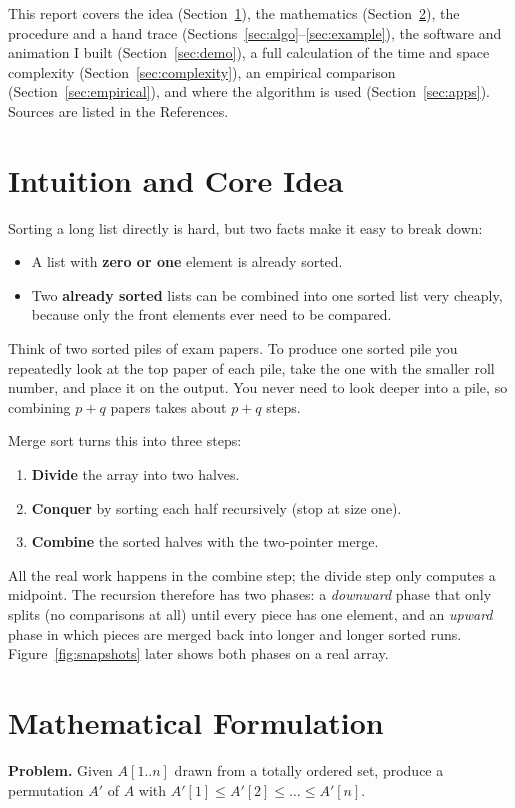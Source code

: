 \documentclass[11pt,a4paper]{article}
\theoremstyle{plain}
\theoremstyle{definition}
\begin{document}
This report covers the idea (Section~\ref{sec:intuition}), the mathematics (Section~\ref{sec:math}), the procedure and a hand trace (Sections~\ref{sec:algo}--\ref{sec:example}), the software and animation I built (Section~\ref{sec:demo}), a full calculation of the time and space complexity (Section~\ref{sec:complexity}), an empirical comparison (Section~\ref{sec:empirical}), and where the algorithm is used (Section~\ref{sec:apps}). Sources are listed in the References.

\section{Intuition and Core Idea}\label{sec:intuition}
Sorting a long list directly is hard, but two facts make it easy to break down:
\begin{itemize}
  \item A list with \textbf{zero or one} element is already sorted.
  \item Two \textbf{already sorted} lists can be combined into one sorted list very cheaply, because only the front elements ever need to be compared.
\end{itemize}
Think of two sorted piles of exam papers. To produce one sorted pile you repeatedly look at the top paper of each pile, take the one with the smaller roll number, and place it on the output. You never need to look deeper into a pile, so combining $p+q$ papers takes about $p+q$ steps.

Merge sort turns this into three steps:
\begin{enumerate}
  \item \textbf{Divide} the array into two halves.
  \item \textbf{Conquer} by sorting each half recursively (stop at size one).
  \item \textbf{Combine} the sorted halves with the two-pointer merge.
\end{enumerate}
All the real work happens in the combine step; the divide step only computes a midpoint. The recursion therefore has two phases: a \emph{downward} phase that only splits (no comparisons at all) until every piece has one element, and an \emph{upward} phase in which pieces are merged back into longer and longer sorted runs. Figure~\ref{fig:snapshots} later shows both phases on a real array.

\section{Mathematical Formulation}\label{sec:math}
\textbf{Problem.} Given $A[1..n]$ drawn from a totally ordered set, produce a permutation $A'$ of $A$ with $A'[1]\le A'[2]\le\dots\le A'[n]$.
\end{document}
